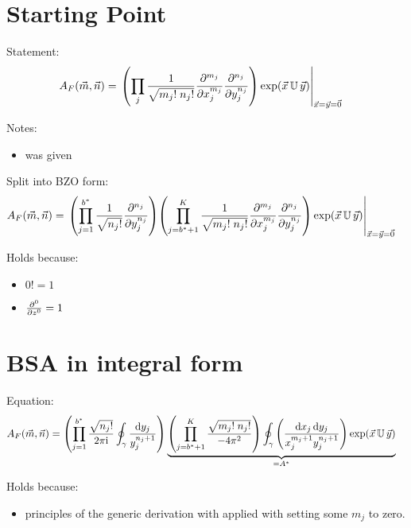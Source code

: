 \documentclass[
	english,
	a4paper,
	fontsize=10pt,
	parskip=half,
	titlepage=true,
	DIV=12,
	final
]{scrreprt}
\newcommand*{\iunit}{\ensuremath{\mathrm{i}}}
\begin{document}
\section{Starting Point}
Statement:
\begin{align}
	A_F(\vec{m}, \vec{n})
&=
	\eval{\qty(
			\prod_{j}
			\frac
				{1}
				{\sqrt{m_j! \; n_j!}}
			\pdv[m_j]{x_j}
			\pdv[n_j]{y_j}
		) \exp(\vec{x} \, \mathbb{U} \, \vec{y})
	}_{\vec{x} = \vec{y} = \vec{0}}
\label{eqn:BSA_raw}
\end{align}

Notes:
\begin{itemize}
\item was given
\end{itemize}


Split into BZO form:
\begin{align}
	A_F(\vec{m}, \vec{n})
&=
	\eval{
		\qty(
			\prod_{j=1}^{b^*}
			\frac
				{1}
				{\sqrt{n_j!}}
			\pdv[n_j]{y_j}
		) 
		\qty(
			\prod_{j=b^* + 1}^{K}
			\frac
				{1}
				{\sqrt{m_j! \; n_j!}}
			\pdv[m_j]{x_j}
			\pdv[n_j]{y_j}
		)
		\exp(\vec{x} \, \mathbb{U} \, \vec{y})
	}_{\vec{x} = \vec{y} = \vec{0}}
\label{eqn:BSA_raw_BZO}
\end{align}

Holds because:
\begin{itemize}
\item $0! = 1$
\item $\pdv[0]{z} = 1$
\end{itemize}

\section{BSA in integral form}
Equation:
\begin{align}
	A_F(\vec{m}, \vec{n})
&=
	\qty(
		\prod_{j=1}^{b^*}
		\frac
			{\sqrt{n_j !}}
			{2\pi\iunit}
		\oint_{\gamma}
			\frac
				{\dd{y_j}}
				{y_j^{n_j + 1}}
	)
	\underbrace{
		\qty(
			\prod_{j=b^* + 1}^{K}
			\frac
				{\sqrt{m_j! \; n_j!}}
				{-4\pi^{2}}
		)
		\oint_{\gamma}
			\qty(
				\frac
				{\dd{x_j} \dd{y_j}}
				{x_j^{m_j+1}  y_j^{n_j+1}}
			)
			\exp(\vec{x} \, \mathbb{U} \, \vec{y})
		}_{=A^*}
	\label{eqn:BSA_Int_BZO}
\end{align}

Holds because:
\begin{itemize}
\item principles of the generic derivation with applied with setting some $m_j$ to zero.
\end{itemize}
\end{document}
